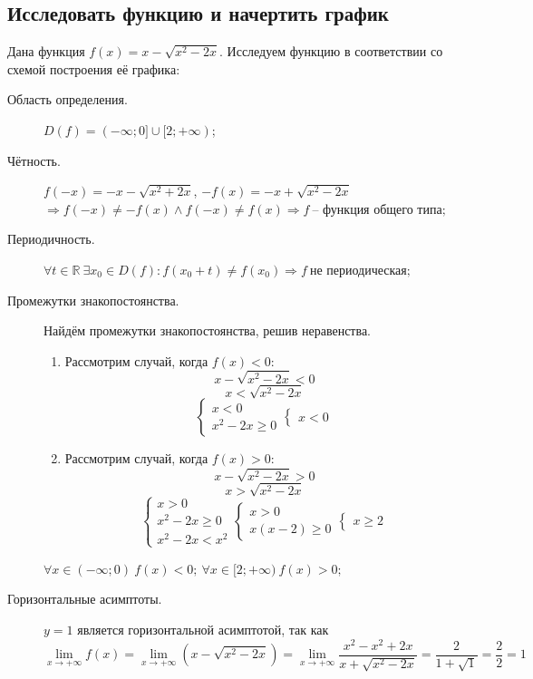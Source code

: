 \documentclass{article}
\newcommand{\mysection}[3]{\setcounter{section}{#1}\setcounter{subsection}{#2}\addtocounter{subsection}{-1}\subsection{#3}}
\begin{document}
\clearpage
\mysection{6}{5}{Исследовать функцию и начертить график}
Дана функция $f(x) = x - \sqrt{x^2 - 2x}$. Исследуем функцию в соответствии со схемой построения её графика:
\begin{description}
\item[Область определения.] $D(f) = (-\infty;0]\cup[2;+\infty)$;
\item[Чётность.] $f(-x) = -x - \sqrt{x^2+2x}$, $-f(x) = -x + \sqrt{x^2 - 2x}$ $\Rightarrow f(-x) \not= -f(x) \land f(-x) \not= f(x) \Rightarrow f~\textrm{-- функция общего типа;}$
\item[Периодичность.] $\forall t \in \mathbb{R}~\exists x_0 \in D(f): f(x_0+t)\ne f(x_0)\Rightarrow f~\textrm{не периодическая;}$
\item[Промежутки знакопостоянства.] Найдём промежутки знакопостоянства, решив неравенства.
\begin{enumerate}
\item Рассмотрим случай, когда $f(x) < 0$:
\begin{equation*}
    x - \sqrt{x^2-2x} < 0
\end{equation*}
\begin{equation*}
    x < \sqrt{x^2-2x}
\end{equation*}
\begin{equation*} \begin{cases*} x < 0 \\ x^2 - 2x \geq 0 \end{cases*}\begin{cases*} x < 0 \end{cases*} \end{equation*}
\item Рассмотрим случай, когда $f(x) > 0$:
\begin{equation*}
    x - \sqrt{x^2-2x} > 0
\end{equation*}
\begin{equation*}
    x > \sqrt{x^2-2x}
\end{equation*}
\begin{equation*} \begin{cases*} x > 0 \\ x^2 - 2x \geq 0 \\ x^2 - 2x < x^2 \end{cases*}\begin{cases*} x > 0 \\ x(x-2) \geq 0 \end{cases*} \begin{cases*} x \geq 2 \end{cases*} \end{equation*}
\end{enumerate}
$\forall x \in (-\infty; 0)~f(x) < 0;~\forall x \in [2; +\infty)~f(x) > 0;$
\item[Горизонтальные асимптоты.]
    $y = 1$ является горизонтальной асимптотой, так как
    \begin{equation*}
        \lim\limits_{x \to +\infty}{f(x)} = \lim\limits_{x \to +\infty}(x - \sqrt{x^2-2x}) = \lim\limits_{x \to +\infty}\dfrac{x^2-x^2+2x}{x+\sqrt{x^2-2x}} = \dfrac{2}{1+\sqrt{1}} = \dfrac 2 2 = 1
    \end{equation*}


\end{description}
\end{document}
